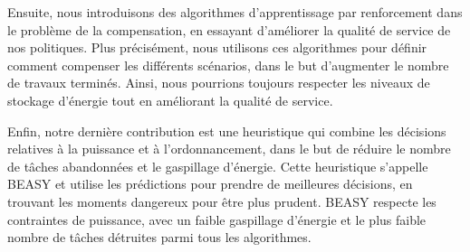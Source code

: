 Ensuite, nous introduisons des algorithmes d'apprentissage par renforcement dans le problème de la compensation, en essayant d'améliorer la qualité de service de nos politiques. Plus précisément, nous utilisons ces algorithmes pour définir comment compenser les différents scénarios, dans le but d'augmenter le nombre de travaux terminés. Ainsi, nous pourrions toujours respecter les niveaux de stockage d'énergie tout en améliorant la qualité de service.

Enfin, notre dernière contribution est une heuristique qui combine les décisions relatives à la puissance et à l'ordonnancement, dans le but de réduire le nombre de tâches abandonnées et le gaspillage d'énergie. Cette heuristique s'appelle BEASY et utilise les prédictions pour prendre de meilleures décisions, en trouvant les moments dangereux pour être plus prudent. BEASY respecte les contraintes de puissance, avec un faible gaspillage d'énergie et le plus faible nombre de tâches détruites parmi tous les algorithmes.